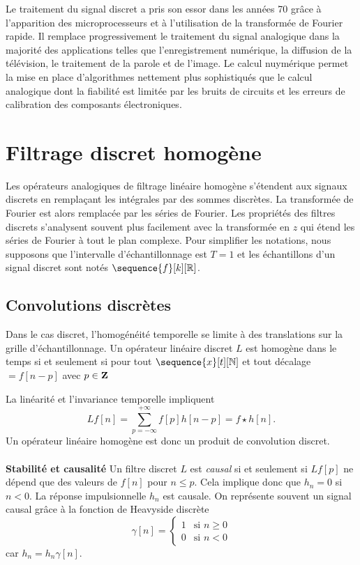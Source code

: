 Le traitement du signal discret a pris son essor dans les ann\'ees
70 gr\^ace \`a
l'apparition des microprocesseurs et \`a l'utilisation de
la transform\'ee de Fourier rapide.
Il remplace progressivement le
traitement du signal analogique dans la majorit\'e des applications
telles que l'enregistrement num\'erique, la diffusion de la t\'el\'evision, le
traitement de la parole et de l'image.
Le calcul nuym\'erique permet la mise en
place d'algorithmes
nettement plus sophistiqu\'es  que le
calcul analogique dont la fiabilit\'e est limit\'ee par
les bruits de circuits et les erreurs
de calibration des composants \'electroniques.

\section{Filtrage discret homog\`ene}

Les op\'erateurs analogiques de filtrage lin\'eaire homog\`ene
s'\'etendent aux signaux discrets en rempla\c{c}ant les
int\'egrales par des sommes discr\`etes.
La transform\'ee de Fourier est alors remplac\'ee par les
s\'eries de Fourier. Les propri\'et\'es des filtres discrets
s'analysent souvent plus facilement
avec la transform\'ee en $z$ qui \'etend les
s\'eries de Fourier \`a tout le plan complexe.
Pour simplifier les notations, nous supposons que l'intervalle d'\'echantillonnage
est $T=1$ et les \'echantillons d'un signal discret sont not\'es
$\sequence{f}[k][\zset]$.

\subsection{Convolutions discr\`etes}
\label{sec-conv}
Dans le cas discret, l'homog\'en\'eit\'e temporelle se limite
\`a des translations sur la grille d'\'echantillonnage.
Un op\'erateur lin\'eaire discret $L$ est homog\`ene dans le
temps si et seulement si pour tout $\sequence{x}[t][\nset]$ et tout
d\'ecalage $ = f[n-p]$ avec $p \in {\bf{Z}}$


La lin\'earit\'e et l'invariance temporelle impliquent
\[
Lf[n] = \sum_{p=-\infty}^{+\infty} f[p] h [n-p] = f \star h [n].
\]
Un op\'erateur lin\'eaire homog\`ene est donc un produit de
convolution discret.
\\
\\
{\bf Stabilit\'e et causalit\'e}
Un filtre discret $L$
est
{\it causal} si et seulement si $Lf[p]$ ne
d\'epend que des valeurs de $f[n]$ pour $n \leq p$. Cela
implique donc que $h_n = 0$ si $n < 0$.
La r\'eponse impulsionnelle $h_n$ est causale.
On repr\'esente souvent un signal causal gr\^ace \`a la fonction
de Heavyside discr\`ete
\begin{equation}
\gamma [n] =
   \left \{ \begin{array}{ll}
            1 & \mbox{si $n \geq 0$}\\
            0 & \mbox{si $n < 0$}
            \end{array}
   \right.
\end{equation}
car $h_n = h_n \gamma [n]$.


